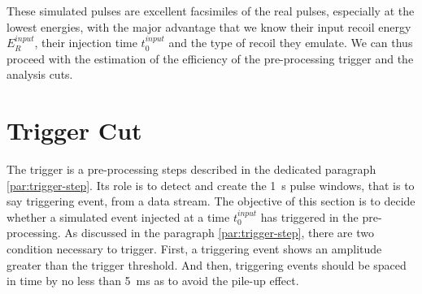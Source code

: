 These simulated pulses are excellent facsimiles of the real pulses, especially at the lowest energies, with the major advantage that we know their input recoil energy $E_R^{input}$, their injection time $t_0^{input}$ and the type of recoil they emulate. We can thus proceed with the estimation of the efficiency of the pre-processing trigger and the analysis cuts.



\section{Trigger Cut}
\label{par:trigger-cut}

The trigger is a pre-processing steps described in the dedicated paragraph \ref{par:trigger-step}. Its role is to detect and create the \SI{1}{\s} pulse windows, that is to say triggering event, from a data stream. The objective of this section is to decide whether a simulated event injected at a time $t_0^{input}$ has triggered in the pre-processing. As discussed in the paragraph \ref{par:trigger-step}, there are two condition necessary to trigger. First, a triggering event shows an amplitude greater than the trigger threshold. And then, triggering events should be spaced in time by no less than \SI{5}{\milli\s} as to avoid the pile-up effect.

